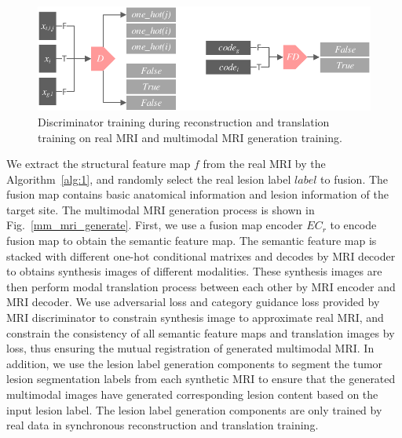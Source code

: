 \documentclass[letterpaper]{article} %
\begin{document}
\begin{figure}
	\centering
	\includegraphics[width=0.75\columnwidth]{figures/D}
	\caption{Discriminator training during reconstruction and translation training on real MRI and multimodal MRI generation training.}
	\label{train_D}
\end{figure}
We extract the structural feature map $f$ from the real MRI by the Algorithm~\ref{alg:1}, and randomly select the real lesion label $label$ to fusion. The fusion map contains basic anatomical information and lesion information of the target site. The multimodal MRI generation process is shown in Fig.~\ref{mm_mri_generate}. First, we use a fusion map encoder $EC_r$ to encode fusion map to obtain the semantic feature map. The semantic feature map is stacked with different one-hot conditional matrixes and decodes by MRI decoder to obtains synthesis images of different modalities. These synthesis images are then perform modal translation process between each other by MRI encoder and MRI decoder. We use adversarial loss and category guidance loss provided by MRI discriminator to constrain synthesis image to approximate real MRI, and constrain the consistency of all semantic feature maps and translation images by loss, thus ensuring the mutual registration of generated multimodal MRI. In addition, we use the lesion label generation components to segment the tumor lesion segmentation labels from each synthetic MRI to ensure that the generated multimodal images have generated corresponding lesion content based on the input lesion label. The lesion label generation components are only trained by real data in synchronous reconstruction and translation training. 
\end{document}
